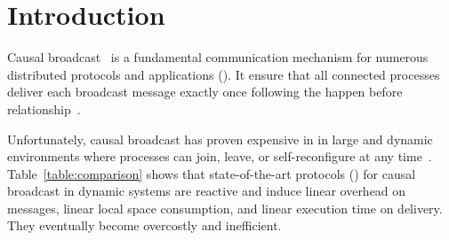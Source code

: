 
\section{Introduction}


Causal broadcast~\cite{hadzilacos1994modular} is a fundamental communication
mechanism for numerous distributed protocols and applications (\REF).
It ensure that all connected processes deliver each broadcast message exactly
once following the happen before
relationship~\cite{lamport1978time,schwarz1994detecting}.


Unfortunately, causal broadcast has proven expensive in in large and dynamic
environments where processes can join, leave, or self-reconfigure at any
time~\cite{charronbost1991concerning}. 
Table~\ref{table:comparison} shows that state-of-the-art protocols (\REF) for
causal broadcast in dynamic systems are reactive and induce linear overhead on
messages, linear local space consumption, and linear execution time on
delivery. They eventually become overcostly and inefficient.


